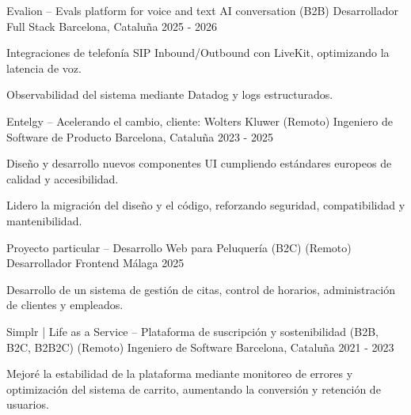 
\begin{cventries}

    \cventry
    {Evalion – Evals platform for voice and text AI conversation (B2B)}
    {Desarrollador Full Stack}
    {Barcelona, Cataluña}
    {2025 - 2026}
    {
    \begin{cvitems}
        \item{Integraciones de telefonía SIP Inbound/Outbound con LiveKit, optimizando la latencia de voz.}         
        \item{Observabilidad del sistema mediante Datadog y logs estructurados.}         
    \end{cvitems}
    }

    \cventry
    {Entelgy – Acelerando el cambio, cliente: Wolters Kluwer (Remoto)}
    {Ingeniero de Software de Producto}
    {Barcelona, Cataluña}
    {2023 - 2025}
    {
    \begin{cvitems}
        \item{Diseño y desarrollo nuevos componentes UI cumpliendo estándares europeos de calidad y accesibilidad.}         
        \item{Lidero la migración del diseño y el código, reforzando seguridad, compatibilidad y mantenibilidad.}         
    \end{cvitems}
    }

    \cventry
    {Proyecto particular – Desarrollo Web para Peluquería (B2C) (Remoto)}
    {Desarrollador Frontend}
    {Málaga}
    {2025}
    {
    \begin{cvitems}
        \item{Desarrollo de un sistema de gestión de citas, control de horarios, administración de clientes y empleados.}
    \end{cvitems}
    }

    \cventry
    {Simplr | Life as a Service – Plataforma de suscripción y sostenibilidad (B2B, B2C, B2B2C) (Remoto)}
    {Ingeniero de Software}
    {Barcelona, Cataluña}
    {2021 - 2023}
    {
    \begin{cvitems}
        \item{Mejoré la estabilidad de la plataforma mediante monitoreo de errores y optimización del sistema de carrito, aumentando la conversión y retención de usuarios.}
    \end{cvitems}
    }


\end{cventries}
